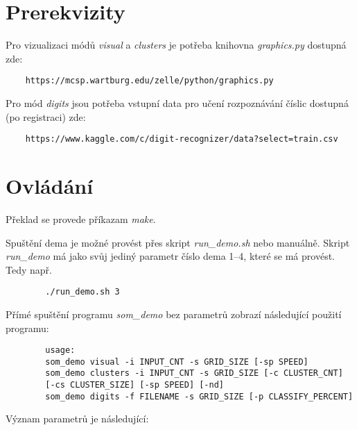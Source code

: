 \documentclass[12pt]{article}
\begin{document}
\section*{Prerekvizity}
Pro vizualizaci módů \textit{visual} a \textit{clusters} je potřeba knihovna \textit{graphics.py} dostupná zde:

\begin{verbatim}
	https://mcsp.wartburg.edu/zelle/python/graphics.py
\end{verbatim}

\noindent
Pro mód \textit{digits} jsou potřeba vstupní data pro učení rozpoznávání číslic dostupná (po registraci) zde:

\begin{verbatim}
	https://www.kaggle.com/c/digit-recognizer/data?select=train.csv
\end{verbatim}

\section*{Ovládání}
Překlad se provede příkazam \textit{make}.

Spuštění dema je možné provést přes skript \textit{run\_demo.sh} nebo manuálně. Skript \textit{run\_demo} má jako svůj jediný parametr číslo dema 1--4, které se má provést. Tedy např. 

\begin{commandline}
	\begin{verbatim}
		./run_demo.sh 3
	\end{verbatim}
\end{commandline}

\newpage

Přímé spuštění programu \textit{som\_demo} bez parametrů zobrazí následující použití programu:

\begin{commandline}
	\begin{verbatim}
		usage:
		som_demo visual -i INPUT_CNT -s GRID_SIZE [-sp SPEED]
		som_demo clusters -i INPUT_CNT -s GRID_SIZE [-c CLUSTER_CNT] 
		[-cs CLUSTER_SIZE] [-sp SPEED] [-nd]
		som_demo digits -f FILENAME -s GRID_SIZE [-p CLASSIFY_PERCENT]
	\end{verbatim}
\end{commandline}

Význam parametrů je následující:
\end{document}

